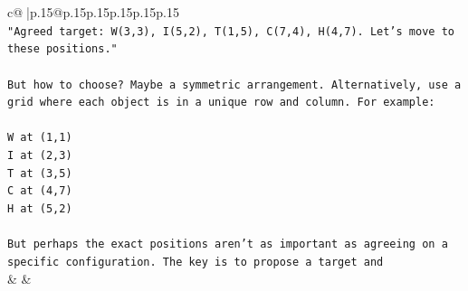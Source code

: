 \documentclass{article}
\begin{document}
{\begin{supertabular}{c@{$\;$}|p{.15\linewidth}@{}p{.15\linewidth}p{.15\linewidth}p{.15\linewidth}p{.15\linewidth}p{.15\linewidth}}
{{{\\ 
\texttt{"Agreed target: W(3,3), I(5,2), T(1,5), C(7,4), H(4,7). Let's move to these positions."} \\
\\ 
\texttt{But how to choose? Maybe a symmetric arrangement. Alternatively, use a grid where each object is in a unique row and column. For example:} \\
\\ 
\texttt{W at (1,1)} \\
\texttt{I at (2,3)} \\
\texttt{T at (3,5)} \\
\texttt{C at (4,7)} \\
\texttt{H at (5,2)} \\
\\ 
\texttt{But perhaps the exact positions aren't as important as agreeing on a specific configuration. The key is to propose a target and} \\
            }
        }
    }
    & & \\ \\


\end{supertabular}}
\end{document}

